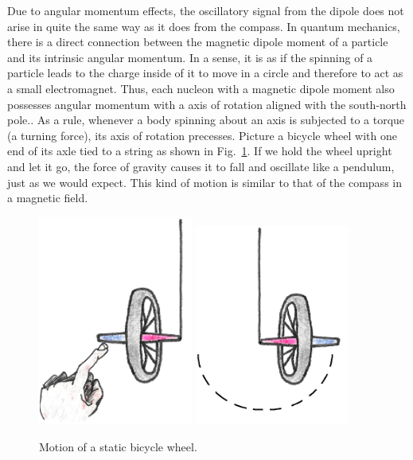 Due to angular momentum effects, the oscillatory signal from the dipole does not arise in quite the same way as it does from the compass.  In quantum mechanics, there is a direct connection between the magnetic dipole moment of a particle and its intrinsic angular momentum. In a sense, it is as if the spinning of a particle leads to the charge inside of it to move in a circle and therefore to act as a small electromagnet. Thus, each nucleon with a magnetic dipole moment also possesses angular momentum with a axis of rotation aligned with the south-north pole..     
As a rule, whenever a body spinning about an axis is subjected to a torque (a turning force), its axis of rotation precesses.  Picture a bicycle wheel with one end of its axle tied to a string as shown in Fig.~\ref{Fig9-16}.  If we hold the wheel upright and let it go, the force of gravity causes it to fall and oscillate like a pendulum, just as we would expect. This kind of motion is similar to that of the compass in a magnetic field.
\begin{figure}[h]
	\centering
	\includegraphics[width=2.0in]{./figures/Topic9/Fig9-16a.png}
           \includegraphics[width=2.0in]{./figures/Topic9/Fig9-16b.png}
	\caption{Motion of a static bicycle wheel.}
 	\label{Fig9-16}
\end{figure}

